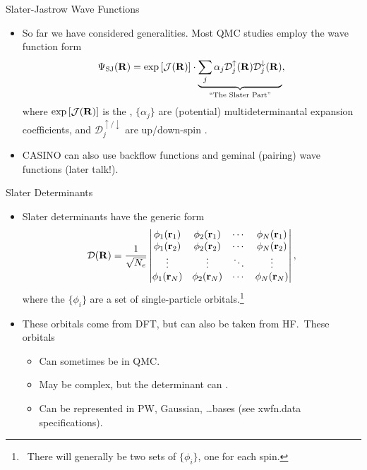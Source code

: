\documentclass[12pt, pdf, hyperref={draft}, usenames, dvipsnames,
aspectratio=169]{beamer}
\newcommand{\blue}[1]{{\bf\color{NavyBlue}{#1}}}
\newcommand{\green}[1]{{\bf\color{ForestGreen}{#1}}}
\begin{document}
\begin{frame}{Slater-Jastrow Wave Functions}
\begin{itemize}
  \item So far we have considered generalities. Most QMC studies employ the
  \blue{Slater-Jastrow} wave function form
  \begin{equation}
    \Psi_{\text{SJ}}({\bf R}) = \exp{\left[ \mathcal{J}({\bf R}) \right]}
    \cdot \underbrace{\sum_j \alpha_j \mathcal{D}^{\uparrow}_{j}({\bf R})
    \mathcal{D}^{\downarrow}_{j}({\bf R})}_{\text{``The Slater Part''}},
  \end{equation}
  where $\exp{\left[ \mathcal{J}({\bf R}) \right]}$ is the \blue{Jastrow
  factor}, $\{ \alpha_j \}$ are (potential) multideterminantal expansion
  coefficients, and $\mathcal{D}^{\uparrow / \downarrow}_j$ are up/down-spin
  \blue{Slater determinants}.
  \item CASINO can also use backflow functions and geminal (pairing) wave
  functions (later talk!).
\end{itemize}
\end{frame}


\begin{frame}{Slater Determinants}
\begin{itemize}
  \item Slater determinants have the generic form
  \begin{equation}
    \mathcal{D}({{\bf R}}) = \dfrac{1}{\sqrt{N_e}}
    \begin{vmatrix}
    \phi_1({\bf r}_1) & \phi_2({\bf r}_1)  & \cdots &
    \phi_N({\bf r}_1) \\
    \phi_1({\bf r}_2) & \phi_2({\bf r}_2)  & \cdots &
    \phi_N({\bf r}_2) \\
    \vdots  & \vdots & \ddots &\vdots \\
    \phi_1({\bf r}_{N}) & \phi_2({\bf r}_N) & \cdots &
    \phi_N({\bf r}_N) \\
    \end{vmatrix},
  \end{equation}
  where the $\{ \phi_i \}$ are a set of single-particle
  orbitals.\footnote{\ There will generally be two sets of $\{ \phi_i \}$, one
  for each spin.}
  \item These orbitals \blue{almost always} come from DFT, but can also be
  taken from HF.\ These orbitals
  \begin{itemize}
    \item Can sometimes be \green{optimised} in QMC.\
    \item May be complex, but the determinant can \green{still be real}.
    \item Can be represented in PW, Gaussian, \ldots bases (see xwfn.data
    specifications).
  \end{itemize}
\end{itemize}
\end{frame}
\end{document}
